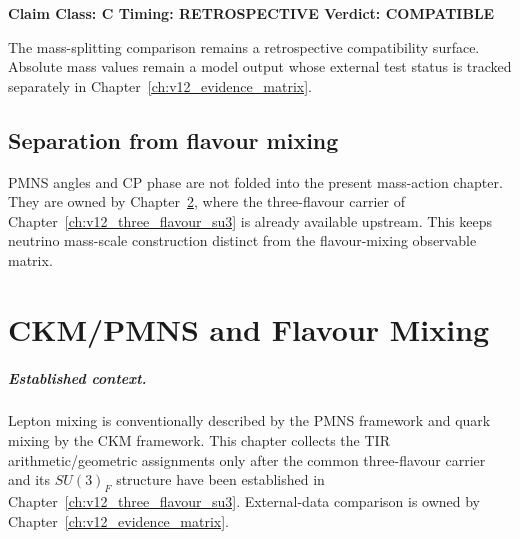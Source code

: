 \documentclass[11pt,a4paper,twoside]{book}
\theoremstyle{definition}
\newcommand{\vTwelveStatus}[3]{\par\noindent\textbf{Claim Class: #1 \quad Timing: #2 \quad Verdict: #3}\par}
\begin{document}
\vTwelveStatus{C}{RETROSPECTIVE}{COMPATIBLE}
The mass-splitting comparison remains a retrospective compatibility surface.
Absolute mass values remain a model output whose external test status is tracked
separately in Chapter~\ref{ch:v12_evidence_matrix}.

\section{Separation from flavour mixing}
PMNS angles and CP phase are not folded into the present mass-action chapter.
They are owned by Chapter~\ref{ch:v12_ckm_pmns}, where the three-flavour carrier
of Chapter~\ref{ch:v12_three_flavour_su3} is already available upstream. This
keeps neutrino mass-scale construction distinct from the flavour-mixing
observable matrix.

\clearpage

\chapter{CKM/PMNS and Flavour Mixing}
\label{ch:v12_ckm_pmns}

\paragraph{Established context.}
Lepton mixing is conventionally described by the PMNS framework and quark
mixing by the CKM framework.  This chapter collects the TIR arithmetic/geometric
assignments only after the common three-flavour carrier and its $SU(3)_F$
structure have been established in Chapter~\ref{ch:v12_three_flavour_su3}.
External-data comparison is owned by Chapter~\ref{ch:v12_evidence_matrix}.
\end{document}
